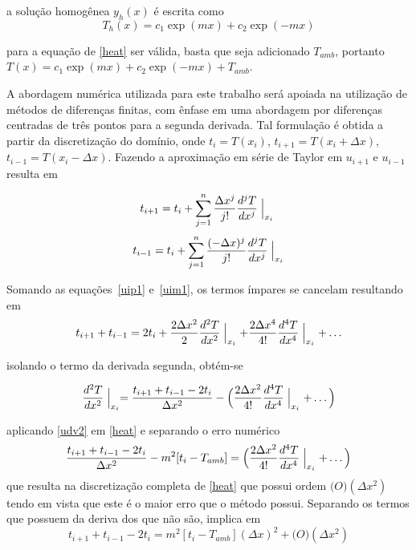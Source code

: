 \documentclass[a4paper, 12pt]{article}
\begin{document}
a solução homogênea $y_{h}(x)$ é escrita como 
\begin{equation}
  \label{homogenous}
  T_{h}(x) = c_1 \exp(mx) + c_2 \exp(-mx)
\end{equation}

para a equação de \ref{heat} ser válida, basta que seja adicionado $T_{amb}$, portanto $T(x)= c_1 \exp(mx) + c_2 \exp(-mx)+T_{amb}$.

A abordagem numérica utilizada para este trabalho será apoiada na utilização de métodos de diferenças finitas, com ênfase em uma abordagem por diferenças centradas de três pontos para a 
segunda derivada. 
Tal formulação é obtida a partir da discretização do domínio, onde $t_i = T(x_i)$, $t_{i+1} = T(x_i + \Delta x)$, $t_{i-1} = T(x_i - \Delta x)$. 
Fazendo a aproximação em série de Taylor em $u_{i+1}$ e $u_{i-1}$ resulta em 

\begin{equation}
  \label{uip1}
  t_{i+1} = t_i+\sum_{j=1}^n \frac{\Delta x^j}{j!}\frac{d^jT}{dx^j}\Bigm\lvert_{x_i} \\ 
\end{equation}
\begin{equation}
  \label{uim1}
  t_{i-1} = t_i+\sum_{j=1}^n \frac{(-\Delta x)^j}{j!}\frac{d^jT}{dx^j}\Bigm\lvert_{x_i}
\end{equation}

Somando as equações~\ref{uip1} e~\ref{uim1}, os termos ímpares se cancelam resultando em 
\begin{equation}
  \label{uims}
  t_{i+1}+t_{i-1}= 2t_i + \frac{2\Delta x^2}{2}\frac{d^2T}{dx^2}\Bigm\lvert_{x_i} + \frac{2\Delta x^4}{4!}\frac{d^4T}{dx^4}\Bigm\lvert_{x_i} + \ldots
\end{equation}

isolando o termo da derivada segunda, obtém-se

\begin{equation}
  \label{udv2}
  \frac{d^2T}{dx^2}\Bigm\lvert_{x_i}=\frac{t_{i+1}+t_{i-1} - 2t_i}{\Delta x^2} - \Big( \frac{2\Delta x^2}{4!}\frac{d^4T}{dx^4}\Bigm\lvert_{x_i} + \ldots \Big)  
\end{equation}

aplicando \ref{udv2} em \ref{heat} e separando o erro numérico 
\begin{equation}
  \label{udv2n}
  \frac{t_{i+1}+t_{i-1} - 2t_i}{\Delta x^2} - m^2 [t_i - T_{amb}] = \Big( \frac{2\Delta x^2}{4!}\frac{d^4T}{dx^4}\Bigm\lvert_{x_i} + \ldots \Big) 
\end{equation}
que resulta na discretização completa de \ref{heat} que possui ordem $\mathcal(O)(\Delta x^2)$ tendo em vista que este é o maior erro que o método possui. Separando os termos que possuem da deriva dos que não são, implica em
\begin{equation}
  \label{udv2r}
  t_{i+1}+t_{i-1} - 2t_i = m^2 [t_i - T_{amb}] (\Delta x)^2+\mathcal(O)(\Delta x^2)
\end{equation}
\end{document}
